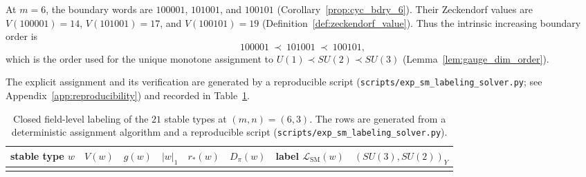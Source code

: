 \begin{remark}[Explicit boundary-value order at $m=6$]\label{rem:boundary_value_order}
At $m=6$, the boundary words are $100001$, $101001$, and $100101$ (Corollary~\ref{prop:cyc_bdry_6}).
Their Zeckendorf values are $V(100001)=14$, $V(101001)=17$, and $V(100101)=19$ (Definition~\ref{def:zeckendorf_value}).
Thus the intrinsic increasing boundary order is
\[
100001\ \prec\ 101001\ \prec\ 100101,
\]
which is the order used for the unique monotone assignment to $U(1)\prec SU(2)\prec SU(3)$ (Lemma~\ref{lem:gauge_dim_order}).
\end{remark}

The explicit assignment and its verification are generated by a reproducible script (\texttt{scripts/exp\_sm\_labeling\_solver.py}; see Appendix~\ref{app:reproducibility}) and recorded in Table~\ref{tab:sm_labeling_table}.

\begin{table}[t]
\centering
\small
\setlength{\tabcolsep}{6pt}
\renewcommand{\arraystretch}{1.15}
\begin{tabular}{llllllll}
\toprule
stable type $w$ & $V(w)$ & $g(w)$ & $|w|_1$ & $r_\ast(w)$ & $D_\pi(w)$ & label $\mathcal{L}_{\mathrm{SM}}(w)$ & $(SU(3),SU(2))_Y$ \\
\midrule
%
\\
\bottomrule
\end{tabular}
\caption{Closed field-level labeling of the $21$ stable types at $(m,n)=(6,3)$. The rows are generated from a deterministic assignment algorithm and a reproducible script (\texttt{scripts/exp\_sm\_labeling\_solver.py}).}
\label{tab:sm_labeling_table}
\end{table}


